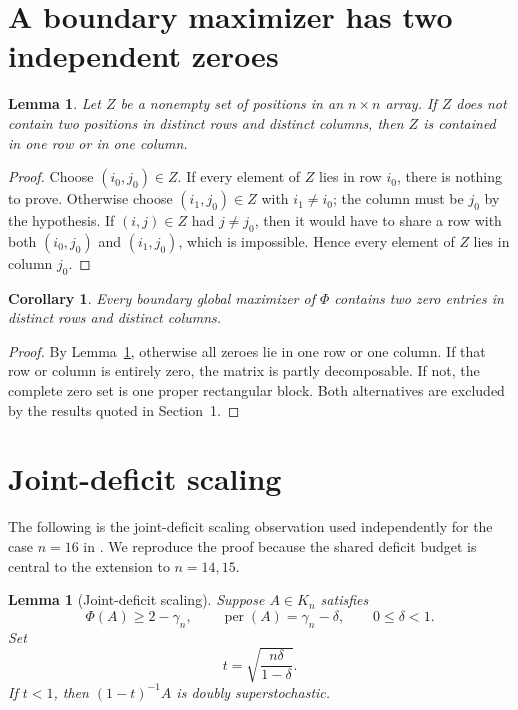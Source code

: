 \documentclass[11pt]{article}
\newtheorem{lemma}[theorem]{Lemma}
\newtheorem{corollary}[theorem]{Corollary}
\theoremstyle{remark}
\newcommand{\per}{\operatorname{per}}
\begin{document}
\section{A boundary maximizer has two independent zeroes}

\begin{lemma}\label{lem:zeros}
Let $Z$ be a nonempty set of positions in an $n\times n$ array.  If $Z$ does
not contain two positions in distinct rows and distinct columns, then $Z$ is
contained in one row or in one column.
\end{lemma}

\begin{proof}
Choose $(i_0,j_0)\in Z$.  If every element of $Z$ lies in row $i_0$, there is
nothing to prove.  Otherwise choose $(i_1,j_0)\in Z$ with $i_1\ne i_0$; the
column must be $j_0$ by the hypothesis.  If $(i,j)\in Z$ had $j\ne j_0$, then
it would have to share a row with both $(i_0,j_0)$ and $(i_1,j_0)$, which is
impossible.  Hence every element of $Z$ lies in column $j_0$.
\end{proof}

\begin{corollary}\label{cor:twozeros}
Every boundary global maximizer of $\Phi$ contains two zero entries in
distinct rows and distinct columns.
\end{corollary}

\begin{proof}
By Lemma~\ref{lem:zeros}, otherwise all zeroes lie in one row or one column.
If that row or column is entirely zero, the matrix is partly decomposable.  If
not, the complete zero set is one proper rectangular block.  Both alternatives
are excluded by the results quoted in Section~1.
\end{proof}

\section{Joint-deficit scaling}

The following is the joint-deficit scaling observation used independently for
the case $n=16$ in \cite{Kafidov2026}.  We reproduce the proof because the
shared deficit budget is central to the extension to $n=14,15$.

\begin{lemma}[Joint-deficit scaling]\label{lem:scaling}
Suppose $A\in K_n$ satisfies
\[
 \Phi(A)\ge 2-\gamma_n,
 \qquad
 \per(A)=\gamma_n-\delta,
 \qquad 0\le\delta<1.
\]
Set
\[
 t=\sqrt{\frac{n\delta}{1-\delta}}.
\]
If $t<1$, then $(1-t)^{-1}A$ is doubly superstochastic.
\end{lemma}
\end{document}
